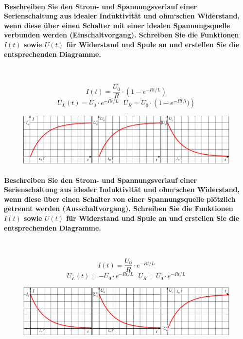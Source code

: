 \documentclass[a4paper, 11pt, parskip=half]{scrartcl}
\begin{document}
\paragraph{Beschreiben Sie den Strom- und Spannungsverlauf einer Serienschaltung aus idealer
Induktivität und ohm‘schen Widerstand, wenn diese über einen Schalter mit einer idealen
Spannungsquelle verbunden werden (Einschaltvorgang). Schreiben Sie die Funktionen $I(t)$ sowie
$U(t)$ für Widerstand und Spule an und erstellen Sie die entsprechenden Diagramme.} ~

\begin{equation}
    I(t) = \frac{U_0}{R} \cdot \left( 1 - e^{-Rt/L} \right)
\end{equation}
\begin{equation}
    U_L(t) = U_0 \cdot e^{-Rt/L} ~~~ U_R = U_0 \cdot \left( 1 - e^{-Rt/l}) \right)
\end{equation}

\begin{figure}[H]
    \centering
    \includegraphics[width=12cm]{image/7/8}
\end{figure}

\paragraph{Beschreiben Sie den Strom- und Spannungsverlauf einer Serienschaltung aus idealer
Induktivität und ohm‘schen Widerstand, wenn diese über einen Schalter von einer
Spannungsquelle plötzlich getrennt werden (Ausschaltvorgang). Schreiben Sie die
Funktionen $I(t)$ sowie $U(t)$ für Widerstand und Spule an und erstellen Sie die entsprechenden
Diagramme.} ~

\begin{equation}
    I(t) = \frac{U_0}{R} \cdot e^{-Rt/L}
\end{equation}
\begin{equation}
    U_L(t) = - U_0 \cdot e^{-Rt/L} ~~~ U_R = U_0 \cdot e^{-Rt/L}
\end{equation}

\begin{figure}[H]
    \centering
    \includegraphics[width=12cm]{image/7/9}
\end{figure}
\end{document}
